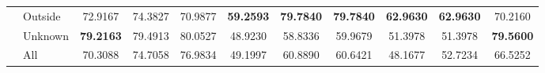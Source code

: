 \begin{table}
\begin{tabular}{llSSSSSSSSS}
		                                       & Outside      & 72.9167                       & 74.3827                       & 70.9877           & \bfseries 59.2593 & \bfseries 79.7840 & \bfseries 79.7840 & \bfseries 62.9630 & \bfseries 62.9630 & 70.2160                                                                                                        \\
		                                       & Unknown      & \bfseries 79.2163             & 79.4913                       & 80.0527           & 48.9230           & 58.8336           & 59.9679           & 51.3978           & 51.3978           & \bfseries 79.5600                                                                                              \\
		                                       & All          & 70.3088                       & 74.7058                       & 76.9834           & 49.1997           & 60.8890           & 60.6421           & 48.1677           & 52.7234           & 66.5252                                                                                                        \\
		\bottomrule
	\end{tabular}
\end{table}

